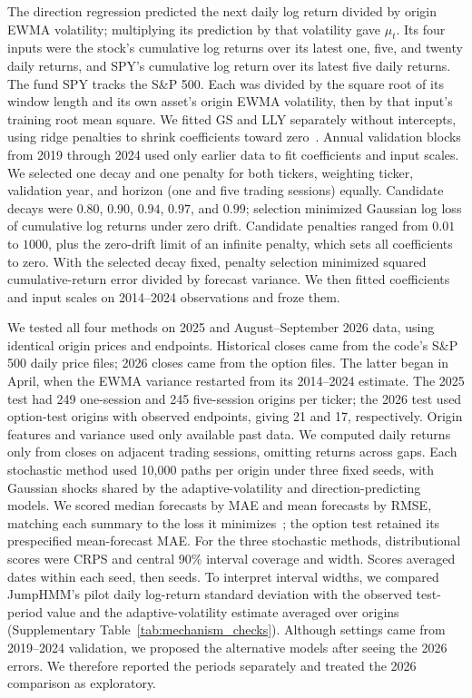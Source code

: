 The direction regression predicted the next daily log return divided by origin EWMA volatility; multiplying its prediction by that volatility gave $\mu_t$. Its four inputs were the stock's cumulative log returns over its latest one, five, and twenty daily returns, and SPY's cumulative log return over its latest five daily returns. The fund SPY tracks the S\&P 500. Each was divided by the square root of its window length and its own asset's origin EWMA volatility, then by that input's training root mean square. We fitted GS and LLY separately without intercepts, using ridge penalties to shrink coefficients toward zero~\cite{hoerl1970}. Annual validation blocks from 2019 through 2024 used only earlier data to fit coefficients and input scales. We selected one decay and one penalty for both tickers, weighting ticker, validation year, and horizon (one and five trading sessions) equally. Candidate decays were $0.80$, $0.90$, $0.94$, $0.97$, and $0.99$; selection minimized Gaussian log loss of cumulative log returns under zero drift. Candidate penalties ranged from $0.01$ to $1000$, plus the zero-drift limit of an infinite penalty, which sets all coefficients to zero. With the selected decay fixed, penalty selection minimized squared cumulative-return error divided by forecast variance. We then fitted coefficients and input scales on 2014--2024 observations and froze them.

We tested all four methods on 2025 and August--September 2026 data, using identical origin prices and endpoints. Historical closes came from the code's S\&P 500 daily price files; 2026 closes came from the option files. The latter began in April, when the EWMA variance restarted from its 2014--2024 estimate. The 2025 test had 249 one-session and 245 five-session origins per ticker; the 2026 test used option-test origins with observed endpoints, giving 21 and 17, respectively. Origin features and variance used only available past data. We computed daily returns only from closes on adjacent trading sessions, omitting returns across gaps. Each stochastic method used 10{,}000 paths per origin under three fixed seeds, with Gaussian shocks shared by the adaptive-volatility and direction-predicting models. We scored median forecasts by MAE and mean forecasts by RMSE, matching each summary to the loss it minimizes~\cite{hyndman2021}; the option test retained its prespecified mean-forecast MAE. For the three stochastic methods, distributional scores were CRPS and central 90\% interval coverage and width. Scores averaged dates within each seed, then seeds. To interpret interval widths, we compared JumpHMM's pilot daily log-return standard deviation with the observed test-period value and the adaptive-volatility estimate averaged over origins (Supplementary Table~\ref{tab:mechanism_checks}). Although settings came from 2019--2024 validation, we proposed the alternative models after seeing the 2026 errors. We therefore reported the periods separately and treated the 2026 comparison as exploratory.
